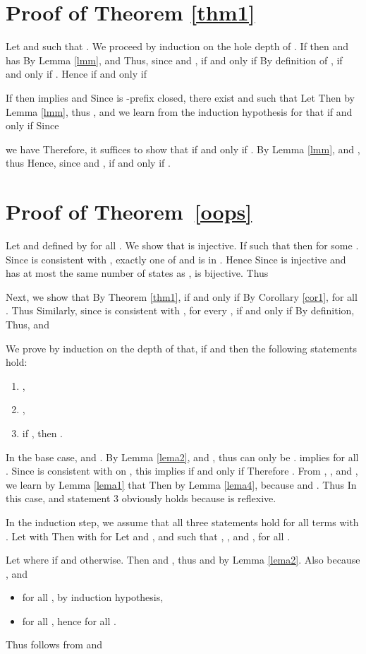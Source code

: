 \documentclass[preprint,12pt,english]{article}
\begin{document}
\section{Proof of Theorem \ref{thm1}}
Let  and  such that . We proceed by induction on the hole depth of . 
If  then  and  has   By Lemma \ref{lmm},  and  Thus, since  and ,  if and only if 
By definition of ,  if and only if . Hence  if and only if 

If  then  implies  and  Since  is -prefix closed, there exist  and  such that  Let  Then  by Lemma \ref{lmm}, thus , and we learn from the induction hypothesis for  that  if and only if  Since 

we have 
Therefore, it suffices to show that  if and only if . By Lemma \ref{lmm},  and , thus 
Hence,  since  and ,   if and only if .  
\section{Proof of Theorem~\ref{oops}}
Let  and  defined by  for all . We show that  is injective. If  such that  then  for some . Since  is consistent with   , exactly one of  and  is in . Hence  
Since  is injective and  has at most the same number of states as ,  is bijective. Thus 


Next, we show that  By Theorem \ref{thm1},  if and only if  By Corollary \ref{cor1},  for all . Thus  Similarly, since  is consistent with , for every ,  if and only if  By definition,  Thus,  and 

We prove by induction on the depth of  that, if  and  then the following statements hold:
\begin{enumerate}
\item ,
\item  ,
\item if , then .
\end{enumerate}
In the base case, 
and . By Lemma \ref{lema2},  and , thus  can only be .  implies  for all . Since  is consistent with  on , this implies   if and only if  Therefore  . From  , , and , we learn by Lemma \ref{lema1} that   
Then  by Lemma \ref{lema4}, because  and . Thus  In this case,  and statement 3 obviously holds because 
is reflexive.

In the induction step, we assume that all three statements hold for all terms  with . Let  with  Then  with  for  Let  and ,  and  such that ,  , and ,  for all .

Let  where  if  and  otherwise. Then  and , thus  and  by Lemma \ref{lema2}. Also  because  , and
\begin{itemize}
\item  for all , by induction hypothesis, 
\item  for all , hence  for all .
\end{itemize}
Thus  follows from   and 
\end{document}
